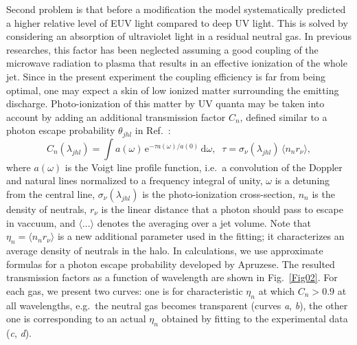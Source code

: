 \documentclass[aip, apl, amsmath,amssymb, reprint]{revtex4-1}
\begin{document}
Second problem is that before a modification the model systematically predicted a higher relative level of EUV light compared to deep UV light. This is solved by considering an absorption of ultraviolet light in a residual neutral gas. In previous researches, this factor has been neglected assuming a good coupling of the microwave radiation to plasma that results in an effective ionization of the whole jet. Since in the present experiment the coupling efficiency is far from being optimal, one may expect a skin of low ionized matter surrounding the emitting discharge. Photo-ionization of this matter by UV quanta may be taken into account by adding an additional transmission factor $C_n$, defined similar to a photon escape probability $\theta_{jhl}$ in Ref.~: 
$$C_n(\lambda_{jhl})=\!\int\! a(\omega)\,\mathrm{e}^{-\tau a(\omega)/a(0)}\,\mathrm{d}\omega, 
\;\; \tau=\sigma_\nu(\lambda_{jhl})\,\langle n_n r_\nu\rangle,
$$
where $a(\omega)$ is the Voigt line profile function, i.e.\ a convolution of the Doppler and natural lines normalized to a frequency integral of unity, $\omega$ is a detuning from the central line, $\sigma_\nu(\lambda_{jhl})$ is the photo-ionization cross-section\cite{kennedy}, $n_n$ is the density of neutrals, $r_\nu$ is the linear distance that a photon should pass to escape in vaccuum, and $\langle ...\rangle$ denotes the averaging over a jet volume. Note that $\eta_n=\langle n_n r_\nu\rangle$ is a new additional parameter used in the fitting; it characterizes an average density of neutrals in the halo. 
In calculations, we use approximate formulas for a photon escape probability developed by Apruzese\cite{apruzese_1985}. The resulted transmission factors as a function of wavelength are shown in Fig.~\ref{Fig02}. 
For each gas, we present two curves: one is for characteristic $\eta_n$ at which $C_n>0.9$ at all wavelengths, e.g.\ the neutral gas becomes transparent (curves \textit{a}, \textit{b}), the other one is corresponding to an actual $\eta_n$ obtained by fitting to the experimental data (\textit{c}, \textit{d}).

\end{document}
